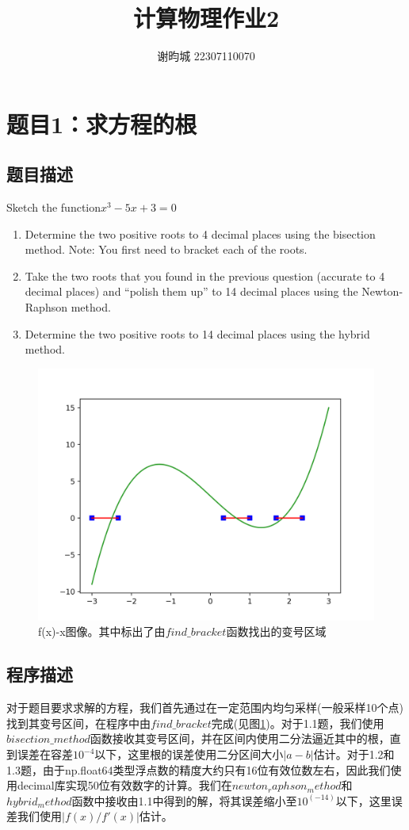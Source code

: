 \documentclass[11pt]{article}
\author{谢昀城 22307110070}
\title{计算物理作业2}
\begin{document}
\maketitle


\section{题目1：求方程的根}
\subsection{题目描述}
Sketch the function$x^3-5x+3=0$
\begin{enumerate}
    \item Determine the two positive roots to 4 decimal places using the bisection method. Note: You first need to bracket each of the roots.
    \item Take the two roots that you found in the previous question (accurate to 4 decimal places) and “polish them up” to 14 decimal places using the Newton-Raphson method.
    \item Determine the two positive roots to 14 decimal places using the hybrid method.
\end{enumerate}
\begin{figure}[!ht]
    \centering
    \includegraphics[width=0.6\linewidth]{photo/f(x) with bracket.png}
    \caption{f(x)-x图像。其中标出了由$find\_bracket$函数找出的变号区域}
    \label{fig:1}
\end{figure}

\subsection{程序描述}
对于题目要求求解的方程，我们首先通过在一定范围内均匀采样(一般采样10个点)找到其变号区间，在程序中由$find\_bracket$完成(见图\ref{fig:1})。对于1.1题，我们使用$bisection\_method$函数接收其变号区间，并在区间内使用二分法逼近其中的根，直到误差在容差$10^{-4}$以下，这里根的误差使用二分区间大小$|a-b|$估计。对于1.2和1.3题，由于np.float64类型浮点数的精度大约只有16位有效位数左右，因此我们使用decimal库实现50位有效数字的计算。我们在$newton_raphson_method$和$hybrid_method$函数中接收由1.1中得到的解，将其误差缩小至$10^(-14)$以下，这里误差我们使用$|f(x)/f'(x)|$估计。
\end{document}
